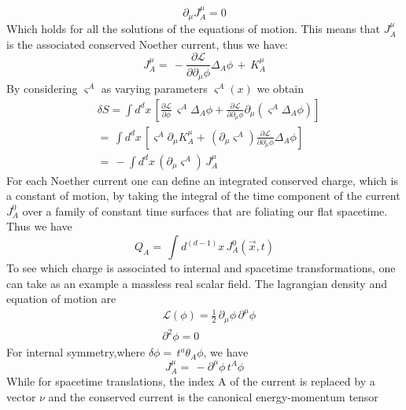 \documentclass[a4paper,10pt]{article}
\begin{document}
\begin{equation}
 \partial_\mu J^\mu_A=0
\end{equation}
Which holds for all the solutions of the equations of motion.
This means that $J^\mu_A$ is the associated conserved Noether current, thus we have:
\begin{equation}
 J^\mu_A=\,-\frac{\partial \mathcal{L}}{\partial \partial_\mu \phi} \Delta_A\phi \, +\, K^\mu_A
\end{equation}
By considering $\varsigma^A$ as varying parameters $\varsigma^A(x)$ we obtain
\begin{equation}
\begin{split}
  &\delta S= \int{ d^dx \,\left[ \frac{\partial \mathcal{L}}{\partial \phi}\,\varsigma^A \Delta_A\phi + \frac{\partial \mathcal{L}}{\partial \partial_\mu \phi}\partial_\mu(\varsigma^A \Delta_A\phi)\right]}\\
  &=\, \int{ d^dx \,\left[\varsigma^A \partial_\mu K^\mu_A+\,(\partial_\mu\varsigma^A) \frac{\partial \mathcal{L}}{\partial \partial_\mu \phi} \Delta_A \phi \right]}\\
  &=\, -\int{d^dx\,(\partial_\mu\varsigma^A)\,J^\mu_A}
\end{split}                        
\end{equation}
For each Noether current one can define an integrated conserved charge, which is a constant of motion, by taking the integral of the time component of the current $J^0_A$ over a family of constant time surfaces that are foliating our flat spacetime.\\
Thus we have
\begin{equation}
 Q_A=\,\int{d^{(d-1)}x\,J^0_A(\overrightarrow{x},t)}
\end{equation}
To see which charge is associated to internal and spacetime transformations, one can take as an example a massless real scalar field. The lagrangian density and equation of motion are
\begin{equation}
 \begin{split}
  &\mathcal{L}(\phi)=\frac{1}{2}\,\partial_\mu \phi\, \partial^\mu \phi\\
  &\partial^2 \phi=0
 \end {split}
\end{equation}
For internal symmetry,where $\delta\phi=\,t^a\theta_A\phi$, we have
\begin{equation}
 J^\mu_A=\,-\partial^\mu\phi\,t^A\phi
\end{equation}
While for spacetime translations, the index A of the current is replaced by a vector $\nu$ and the conserved current is the canonical energy-momentum tensor
\end{document}
